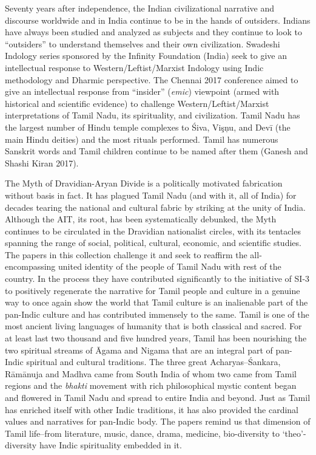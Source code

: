 Seventy years after independence, the Indian civilizational narrative and discourse worldwide and in India continue to be in the hands of outsiders. Indians have always been studied and analyzed as subjects and they continue to look to “outsiders” to understand themselves and their own civilization. Swadeshi Indology series sponsored by the Infinity Foundation (India) seek to give an intellectual response to Western/Leftist/Marxist Indology using Indic methodology and Dharmic perspective. The Chennai 2017 conference aimed to give an intellectual response from “insider” (\textit{emic}) viewpoint (armed with historical and scientific evidence) to challenge Western/Leftist/Marxist interpretations of Tamil Nadu, its spirituality, and civilization. Tamil Nadu has the largest number of Hindu temple complexes to Śiva, Vişņu, and Devī (the main Hindu deities) and the most rituals performed. Tamil has numerous Sanskrit words and Tamil children continue to be named after them (Ganesh and Shashi Kiran 2017).

The Myth of Dravidian-Aryan Divide is a politically motivated fabrication without basis in fact. It has plagued Tamil Nadu (and with it, all of India) for decades tearing the national and cultural fabric by striking at the unity of India. Although the AIT, its root, has been systematically debunked, the Myth continues to be circulated in the Dravidian nationalist circles, with its tentacles spanning the range of social, political, cultural, economic, and scientific studies. The papers in this collection challenge it and seek to reaffirm the all-encompassing united identity of the people of Tamil Nadu with rest of the country. In the process they have contributed significantly to the initiative of SI-3 to positively regenerate the narrative for Tamil people and culture in a genuine way to once again show the world that Tamil culture is an inalienable part of the pan-Indic culture and has contributed immensely to the same. Tamil is one of the most ancient living languages of humanity that is both classical and sacred. For at least last two thousand and five hundred years, Tamil has been nourishing the two spiritual streams of Āgama and Nigama that are an integral part of pan-Indic spiritual and cultural traditions. The three great Acharyas–Śankara, Rāmānuja and Madhva came from South India of whom two came from Tamil regions and the \textit{bhakti} movement with rich philosophical mystic content began and flowered in Tamil Nadu and spread to entire India and beyond. Just as Tamil has enriched itself with other Indic traditions, it has also provided the cardinal values and narratives for pan-Indic body. The papers remind us that dimension of Tamil life--from literature, music, dance, drama, medicine, bio-diversity to ‘theo’-diversity have Indic spirituality embedded in it.


